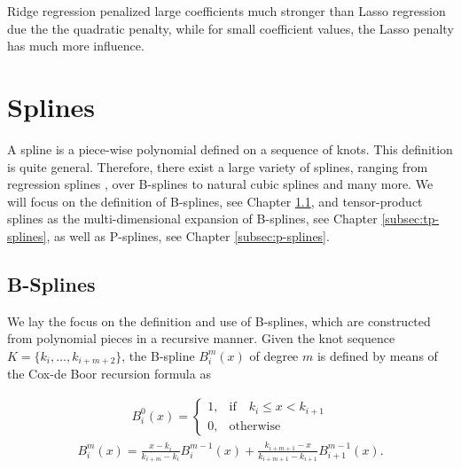 \documentclass[10pt,a4paper]{report}
\begin{document}
Ridge regression penalized large coefficients much stronger than Lasso regression due the the quadratic penalty, while for small coefficient values, the Lasso penalty has much more influence. \cite{tibshirani1996lasso}

\section{Splines} \label{sec:Splines}
	
A spline is a piece-wise polynomial defined on a sequence of knots. This definition is quite general. Therefore, there exist a large variety of splines, ranging from regression splines \cite{eubank1990regressionsplines}, over B-splines \cite{deBoor1978practicalGuideToSplines} to natural cubic splines and many more. We will focus on the definition of B-splines, see Chapter \ref{subsec:b-splines}, and tensor-product splines as the multi-dimensional expansion of B-splines, see Chapter \ref{subsec:tp-splines}, as well as P-splines, see Chapter \ref{subsec:p-splines}. \cite{deBoor1978practicalGuideToSplines} \cite{eilers1996flexible}
\subsection{B-Splines} \label{subsec:b-splines}

We lay the focus on the definition and use of B-splines, which are constructed from polynomial pieces in a recursive manner. Given the knot sequence $K = \{k_i, \dots, k_{i+m+2}\}$,  the B-spline $B_i^m(x)$ of degree $m$ is defined by means of the Cox-de Boor recursion formula as

\begin{align} \label{eq:Bspline_recDef1}
	B_i^0(x) = \begin{cases} 1, & \text{if} \quad k_i \le x < k_{i+1} \\ 
					 		 0, & \text{otherwise} 
	\end{cases}
\end{align}
\begin{align} \label{eq:Bspline_recDef2}
	B_i^m(x) = \frac{x - k_i}{k_{i+m} - k_i} B_i^{m-1}(x) + \frac{k_{i+m+1} - x}{k_{i+m+1} - k_{i+1}} B_{i+1}^{m-1}(x).
\end{align}
\end{document}
